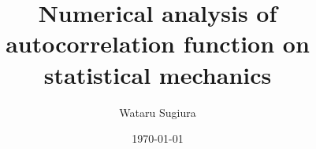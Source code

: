 \title{Numerical analysis of autocorrelation function on statistical mechanics}
\author{Wataru Sugiura}
\date{\today}
